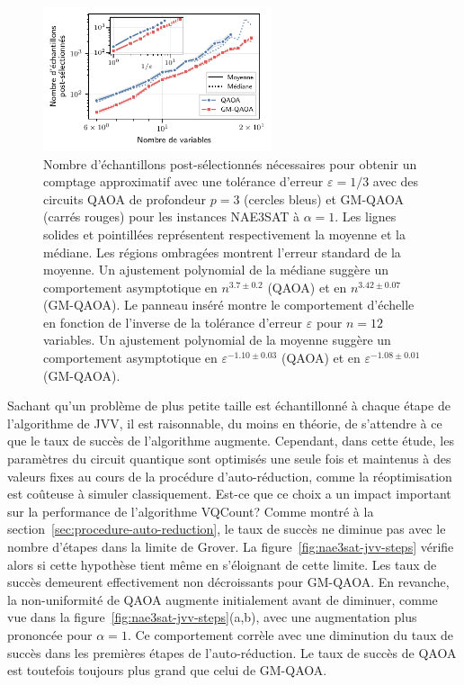 \begin{figure}[ht!]
    \centering
    \includegraphics[width=0.6\textwidth]{figures/nae3sat-scaling.pdf}
    \caption[Comportement d'échelle du nombre d'échantillons post-sélectionnés pour \#NAE3SAT]{Nombre d'échantillons post-sélectionnés nécessaires pour obtenir un comptage approximatif avec une tolérance d'erreur $\varepsilon=1/3$ avec des circuits QAOA de profondeur $p=3$ (cercles bleus) et GM-QAOA (carrés rouges) pour les instances NAE3SAT à $\alpha=1$. Les lignes solides et pointillées représentent respectivement la moyenne et la médiane. Les régions ombragées montrent l'erreur standard de la moyenne. Un ajustement polynomial de la médiane suggère un comportement asymptotique en $n^{3.7 \pm 0.2}$ (QAOA) et en $n^{3.42 \pm 0.07}$ (GM-QAOA). Le panneau inséré montre le comportement d'échelle en fonction de l'inverse de la tolérance d'erreur $\varepsilon$ pour $n=12$ variables. Un ajustement polynomial de la moyenne suggère un comportement asymptotique en $\varepsilon^{-1.10 \pm 0.03}$ (QAOA) et en $\varepsilon^{-1.08 \pm 0.01}$ (GM-QAOA).}
    \label{fig:nae3sat-scaling}
\end{figure}

Sachant qu'un problème de plus petite taille est échantillonné à chaque étape de l'algorithme de JVV, il est raisonnable, du moins en théorie, de s'attendre à ce que le taux de succès de l'algorithme augmente. Cependant, dans cette étude, les paramètres du circuit quantique sont optimisés une seule fois et maintenus à des valeurs fixes au cours de la procédure d'auto-réduction, comme la réoptimisation est coûteuse à simuler classiquement. Est-ce que ce choix a un impact important sur la performance de l'algorithme VQCount? Comme montré à la section~\ref{sec:procedure-auto-reduction}, le taux de succès ne diminue pas avec le nombre d'étapes dans la limite de Grover. La figure~\ref{fig:nae3sat-jvv-steps} vérifie alors si cette hypothèse tient même en s'éloignant de cette limite. Les taux de succès demeurent effectivement non décroissants pour GM-QAOA. En revanche, la non-uniformité de QAOA augmente initialement avant de diminuer, comme vue dans la figure~\ref{fig:nae3sat-jvv-steps}(a,b), avec une augmentation plus prononcée pour $\alpha = 1$. Ce comportement corrèle avec une diminution du taux de succès dans les premières étapes de l'auto-réduction. Le taux de succès de QAOA est toutefois toujours plus grand que celui de GM-QAOA. 

